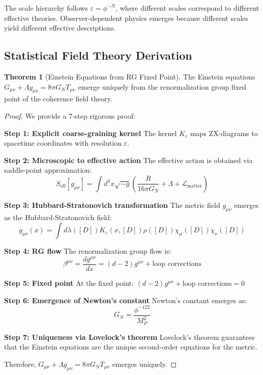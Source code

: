 \documentclass[11pt]{article}
\theoremstyle{definition}
\newtheorem{theorem}{Theorem}[section]
\newcommand{\goldenratio}{\phi}
\newcommand{\density}{\rho}
\begin{document}
The scale hierarchy follows $\varepsilon = \goldenratio^{-N}$, where different scales correspond to different effective theories. Observer-dependent physics emerges because different scales yield different effective descriptions.

\subsection{Statistical Field Theory Derivation}

\begin{theorem}[Einstein Equations from RG Fixed Point]
The Einstein equations $G_{\mu\nu} + \Lambda g_{\mu\nu} = 8\pi G_N T_{\mu\nu}$ emerge uniquely from the renormalization group fixed point of the coherence field theory.
\end{theorem}

\begin{proof}
We provide a 7-step rigorous proof:

\textbf{Step 1: Explicit coarse-graining kernel}
The kernel $K_\varepsilon$ maps ZX-diagrams to spacetime coordinates with resolution $\varepsilon$.

\textbf{Step 2: Microscopic to effective action}
The effective action is obtained via saddle-point approximation:
\begin{equation}
S_{\text{eff}}[g_{\mu\nu}] = \int d^4x \sqrt{-g} \left(\frac{R}{16\pi G_N} + \Lambda + \mathcal{L}_{\text{matter}}\right)
\end{equation}

\textbf{Step 3: Hubbard-Stratonovich transformation}
The metric field $g_{\mu\nu}$ emerges as the Hubbard-Stratonovich field:
\begin{equation}
g_{\mu\nu}(x) = \int d\lambda([D]) K_\varepsilon(x, [D]) \density([D]) \chi_\mu([D]) \chi_\nu([D])
\end{equation}

\textbf{Step 4: RG flow}
The renormalization group flow is:
\begin{equation}
\beta^{\mu\nu} = \frac{dg^{\mu\nu}}{ds} = (d-2)g^{\mu\nu} + \text{loop corrections}
\end{equation}

\textbf{Step 5: Fixed point}
At the fixed point: $(d-2)g^{\mu\nu} + \text{loop corrections} = 0$

\textbf{Step 6: Emergence of Newton's constant}
Newton's constant emerges as:
\begin{equation}
G_N = \frac{\goldenratio^{-122}}{M_P^2}
\end{equation}

\textbf{Step 7: Uniqueness via Lovelock's theorem}
Lovelock's theorem guarantees that the Einstein equations are the unique second-order equations for the metric.

Therefore, $G_{\mu\nu} + \Lambda g_{\mu\nu} = 8\pi G_N T_{\mu\nu}$ emerges uniquely.
\end{proof}
\end{document}
